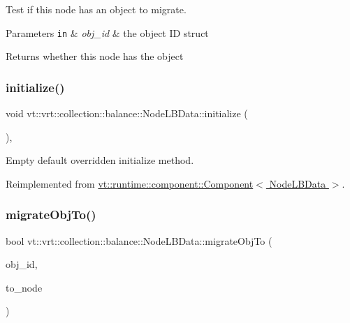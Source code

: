 Test if this node has an object to migrate. 


\begin{DoxyParams}[1]{Parameters}
\mbox{\tt in}  & {\em obj\+\_\+id} & the object ID struct\\
\hline
\end{DoxyParams}
\begin{DoxyReturn}{Returns}
whether this node has the object 
\end{DoxyReturn}
\mbox{\label{structvt_1_1vrt_1_1collection_1_1balance_1_1_node_l_b_data_aa489e1252abac8237d30bb0110ad36f9}} 
\subsubsection{\texorpdfstring{initialize()}{initialize()}}
{\footnotesize\ttfamily void vt\+::vrt\+::collection\+::balance\+::\+Node\+L\+B\+Data\+::initialize (\begin{DoxyParamCaption}{ }\end{DoxyParamCaption})\hspace{0.3cm}{\ttfamily [override]}, {\ttfamily [virtual]}}



Empty default overridden initialize method. 



Reimplemented from \hyperlink{structvt_1_1runtime_1_1component_1_1_component_a7f07384d294e59796add9ce6be2d6410}{vt\+::runtime\+::component\+::\+Component$<$ Node\+L\+B\+Data $>$}.

\mbox{\label{structvt_1_1vrt_1_1collection_1_1balance_1_1_node_l_b_data_a66619f696c49ce53d005f4b9ebbf12a2}} 
\subsubsection{\texorpdfstring{migrate\+Obj\+To()}{migrateObjTo()}}
{\footnotesize\ttfamily bool vt\+::vrt\+::collection\+::balance\+::\+Node\+L\+B\+Data\+::migrate\+Obj\+To (\begin{DoxyParamCaption}\item[{\hyperlink{namespacevt_1_1vrt_1_1collection_1_1balance_a9f5b53fafb270212279a4757d2c4cd28}{Element\+I\+D\+Struct}}]{obj\+\_\+id,  }\item[{\hyperlink{namespacevt_a866da9d0efc19c0a1ce79e9e492f47e2}{Node\+Type}}]{to\+\_\+node }\end{DoxyParamCaption})}



